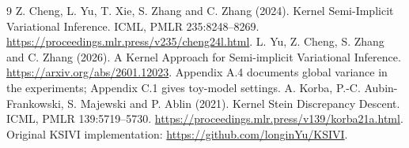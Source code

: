 \documentclass[11pt,a4paper]{article}
\numberwithin{equation}{section}
\begin{document}
\begin{thebibliography}{9}
 Z. Cheng, L. Yu, T. Xie, S. Zhang and C. Zhang (2024).
Kernel Semi-Implicit Variational Inference. ICML, PMLR 235:8248--8269.
\url{https://proceedings.mlr.press/v235/cheng24l.html}.
 L. Yu, Z. Cheng, S. Zhang and C. Zhang (2026).
A Kernel Approach for Semi-implicit Variational Inference.
\url{https://arxiv.org/abs/2601.12023}. Appendix A.4 documents global
variance in the experiments; Appendix C.1 gives toy-model settings.
 A. Korba, P.-C. Aubin-Frankowski, S. Majewski and P. Ablin
(2021). Kernel Stein Discrepancy Descent. ICML, PMLR 139:5719--5730.
\url{https://proceedings.mlr.press/v139/korba21a.html}.
 Original KSIVI implementation:
\url{https://github.com/longinYu/KSIVI}.
\end{thebibliography}
\end{document}
